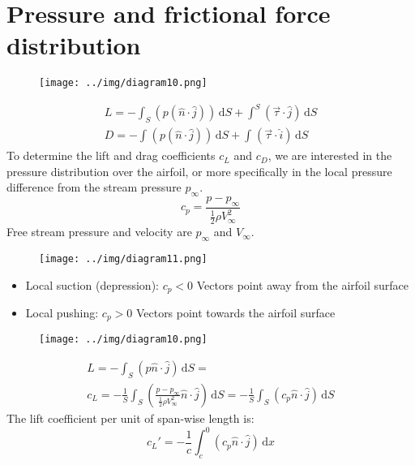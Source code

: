 \documentclass[class=report, crop=false, 12pt,a4paper]{standalone}
\begin{document}
\section{Pressure and frictional force distribution}
\begin{figure}[H]
  \centering
  \texttt{[image: ../img/diagram10.png]}
\end{figure}
\begin{gather}
  L = - \int_{S}^{} \left( p (\hat{n}\cdot \hat{j}) \right)  \,\mathrm{d}S + \int_{}^{S} \left( \vec{\tau} \cdot \hat{j} \right)  \,\mathrm{d}S\\
  D = - \int_{}^{} \left(  p (\hat{n} \cdot \hat{j})\right)  \,\mathrm{d}S  + \int_{}^{} \left(\vec{\tau} \cdot \hat{i} \right)  \,\mathrm{d}S 
\end{gather}
To determine the lift and drag coefficients $c_L$ and $c_D$, we are interested in the pressure distribution over the airfoil, or more specifically in the local pressure difference from the stream pressure $p_{\infty}$.
\begin{equation}
  c_p = \frac{p - p_{\infty}}{\frac{1}{2} \rho V_{\infty}^2}
\end{equation}
Free stream pressure and velocity are $p_\infty$ and $V_\infty$.
\begin{figure}[H]
  \centering
  \texttt{[image: ../img/diagram11.png]}
\end{figure}
\begin{itemize}
  \item Local suction (depression): $c_p < 0$ Vectors point away from the airfoil surface
  \item Local pushing: $c_p > 0$ Vectors point towards the airfoil surface
\end{itemize}
\begin{figure}[H]
  \centering
  \texttt{[image: ../img/diagram10.png]}
\end{figure}
\begin{gather}
  L = - \int_{S}^{} \left(p\hat{n}\cdot \hat{j}\right)  \,\mathrm{d}S = \\
  c_L = - \frac{1}{S} \int_{S}^{} \left( \frac{p - p_{\infty}}{\frac{1}{2} \rho V_{\infty}^2} \hat{n} \cdot \hat{j} \right) \,\mathrm{d}S = -\frac{1}{S} \int_{S}^{} \left( c_p \hat{n} \cdot \hat{j} \right)  \,\mathrm{d}S  
\end{gather}
The lift coefficient per unit of span-wise length is:
\begin{equation}
  c_L' = - \frac{1}{c}\int_{c}^{0} \left( c_p \hat{n}\cdot\hat{j} \right)  \,\mathrm{d}x 
\end{equation}
\end{document}
